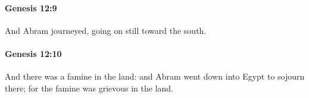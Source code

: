 		\paragraph{Genesis 12:9} %
			\label{GENESIS-12-9}

			And Abram journeyed, going on still toward the south.


		\paragraph{Genesis 12:10} %
			\label{GENESIS-12-10}

			And there was a famine in the land: and Abram went down into Egypt to sojourn there; for the famine was grievous in the land.


